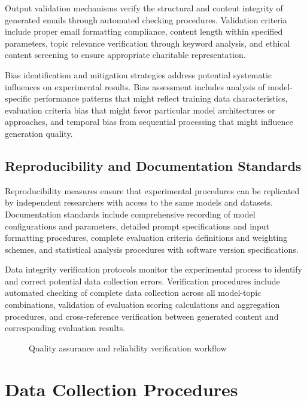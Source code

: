 Output validation mechanisms verify the structural and content integrity of generated emails through automated checking procedures. Validation criteria include proper email formatting compliance, content length within specified parameters, topic relevance verification through keyword analysis, and ethical content screening to ensure appropriate charitable representation.

Bias identification and mitigation strategies address potential systematic influences on experimental results. Bias assessment includes analysis of model-specific performance patterns that might reflect training data characteristics, evaluation criteria bias that might favor particular model architectures or approaches, and temporal bias from sequential processing that might influence generation quality.

\subsection{Reproducibility and Documentation Standards}

Reproducibility measures ensure that experimental procedures can be replicated by independent researchers with access to the same models and datasets. Documentation standards include comprehensive recording of model configurations and parameters, detailed prompt specifications and input formatting procedures, complete evaluation criteria definitions and weighting schemes, and statistical analysis procedures with software version specifications.

Data integrity verification protocols monitor the experimental process to identify and correct potential data collection errors. Verification procedures include automated checking of complete data collection across all model-topic combinations, validation of evaluation scoring calculations and aggregation procedures, and cross-reference verification between generated content and corresponding evaluation results.

\begin{figure}[htbp]
    \centering
    \caption{Quality assurance and reliability verification workflow}
    \label{fig:quality-assurance}
\end{figure}

\section{Data Collection Procedures}
\label{sec:data-collection}


